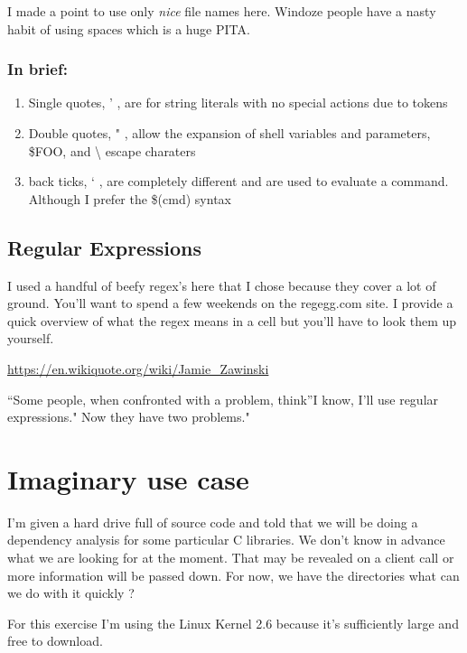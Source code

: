 \documentclass{article}
\begin{document}
I made a point to use only \emph{nice} file names here. Windoze people
have a nasty habit of using spaces which is a huge PITA.

\subsubsection{In brief:}\label{in-brief}

\begin{enumerate}
\def\labelenumi{\arabic{enumi}.}
\itemsep1pt\parskip0pt
\item
  Single quotes, ' , are for string literals with no special actions due
  to tokens
\item
  Double quotes, " , allow the expansion of shell variables and
  parameters, \$FOO, and \textbackslash{} escape charaters
\item
  back ticks, ` , are completely different and are used to evaluate a
  command. Although I prefer the \$(cmd) syntax
\end{enumerate}

\subsection{Regular Expressions}\label{regular-expressions}

I used a handful of beefy regex's here that I chose because they cover a
lot of ground. You'll want to spend a few weekends on the regegg.com
site. I provide a quick overview of what the regex means in a cell but
you'll have to look them up yourself.

\url{https://en.wikiquote.org/wiki/Jamie\_Zawinski}

``Some people, when confronted with a problem, think''I know, I'll use
regular expressions." Now they have two problems."

    \section{Imaginary use case}\label{imaginary-use-case}

I'm given a hard drive full of source code and told that we will be
doing a dependency analysis for some particular C libraries. We don't
know in advance what we are looking for at the moment. That may be
revealed on a client call or more information will be passed down. For
now, we have the directories what can we do with it quickly ?

For this exercise I'm using the Linux Kernel 2.6 because it's
sufficiently large and free to download.
\end{document}
